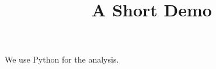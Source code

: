 \documentclass[article]{jss}
\title{A Short Demo}
\begin{document}
We use Python for the analysis.
\end{document}
